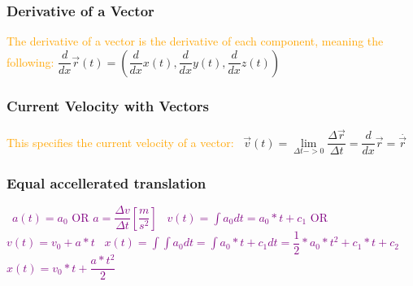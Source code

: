 \documentclass[main.tex,fontsize=8pt,paper=a4,paper=portrait,DIV=calc,]{scrartcl}
\begin{document}
\begin{multicols*}{2}
\subsubsection{Derivative of a Vector}
\textcolor{orange}{The derivative of a vector is the derivative of each component, meaning the following:}\newline
\large \(\dfrac{d}{dx} \vec{r}(t) = (\dfrac{d}{dx} x(t), \dfrac{d}{dx} y(t), \dfrac{d}{dx} z(t) ) \)\newline
\, \newline \normalsize

\subsubsection{Current Velocity with Vectors}
\textcolor{orange}{This specifies the current velocity of a vector:}\newline
\, \newline
\large \( \vec{v}(t) = \underset{\Delta t -> 0}{\lim} \dfrac{\Delta \vec{r}}{\Delta t} = \dfrac{d}{dx} \vec{r} = \overset{.}{\vec{r}} \) \newline 
\, \newline \normalsize

\subsubsection{Equal accellerated translation}
\, \newline
\large \textcolor{purple}{\( a(t) = a_0 \) OR \(a = \dfrac{\Delta v}{\Delta t} [\dfrac{m}{s^2}]\) }\newline
\, \newline
\large \textcolor{purple}{\( v(t) = \int{a_0 dt} = a_0 * t + c_1 \) OR \(v(t) = v_0 + a * t\)}\newline
\, \newline
\large \textcolor{purple}{\( x(t) = \int{\int{ a_0 dt }} = \int{a_0 * t + c_1 dt} = \dfrac{1}{2}* a_0 * t^2 + c_1 * t + c_2\)}\newline
\, \newline
\large \textcolor{purple}{\( x(t) = v_0 * t + \dfrac{a * t^2}{2} \)}\newline
\, \newline
\normalsize 


\end{multicols*}
\end{document}

